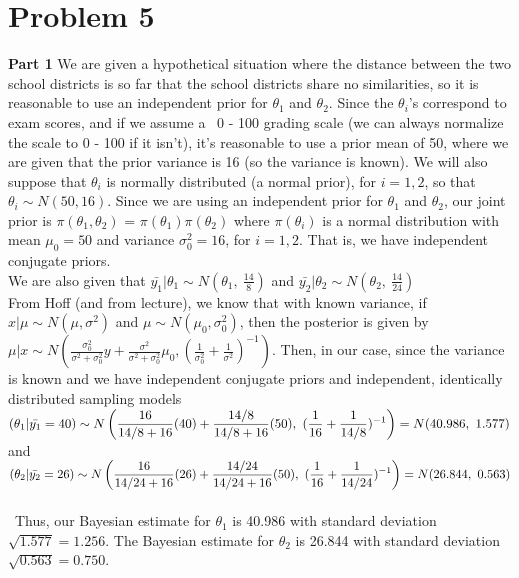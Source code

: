 \documentclass[10pt,a4paper]{article}
\begin{document}
\section{Problem 5}
\textbf{Part 1}
\newline
We are given a hypothetical situation where the distance between the two school districts is so far that the school districts share no similarities, so it is reasonable to use an independent prior for $\theta_1$ and $\theta_2$. Since the $\theta_i$'s correspond to exam scores, and if we assume a \ 0 - 100 grading scale (we can always normalize the scale to 0 - 100 if it isn't), it's reasonable to use a prior mean of 50, where we are given that the prior variance is 16 (so the variance is known). We will also suppose that $\theta_i$ is normally distributed (a normal prior), for $i = 1, 2$, so that $\theta_i \sim N(50, 16)$. Since we are using an independent prior for $\theta_1$ and $\theta_2$, our joint prior is $\pi(\theta_1, \theta_2)$ = $\pi(\theta_1)\pi(\theta_2)$ where $\pi(\theta_i)$ is a normal distribution with mean $\mu_0 = 50$ and variance $\sigma_0^2 = 16$, for $i = 1, 2$. That is, we have independent conjugate priors.\\
We are also given that $\bar{y_1}\vert\theta_1 \sim N(\theta_1, \ \frac{14}{8})$ and $\bar{y_2}\vert\theta_2 \sim N(\theta_2, \ \frac{14}{24})$\\ 
From Hoff (and from lecture), we know that with known variance, if $x \vert \mu \sim N(\mu, \sigma^2)$ and $\mu \sim N(\mu_0, \sigma_0^2)$, then the posterior is given by $\mu\vert x \sim N(\frac{\sigma_0^2}{\sigma^2+\sigma_0^2}y+\frac{\sigma^2}{\sigma^2+\sigma_0^2}\mu_0,(\frac{1}{\sigma_0^2}+\frac{1}{\sigma^2})^{-1})$. Then, in our case, since the variance is known and we have independent conjugate priors and independent, identically distributed sampling models\\
$\mathlarger{(\theta_1\vert \bar{y_1} = 40) \sim N\left(\frac{16}{14/8+16}(40)+\frac{14/8}{14/8+16}(50), \ (\frac{1}{16}+\frac{1}{14/8})^{-1}\right)=N(40.986, \ 1.577)}$ and \\
$\mathlarger{(\theta_2\vert \bar{y_2} = 26) \sim N\left(\frac{16}{14/24+16}(26)+\frac{14/24}{14/24+16}(50), \ (\frac{1}{16}+\frac{1}{14/24})^{-1}\right)=N(26.844, \ 0.563)}$ \\
\\\
Thus, our Bayesian estimate for $\theta_1$ is 40.986 with standard deviation $\sqrt{1.577} = 1.256$. The Bayesian estimate for $\theta_2$ is 26.844 with standard deviation $\sqrt{0.563} = 0.750$.
\end{document}
